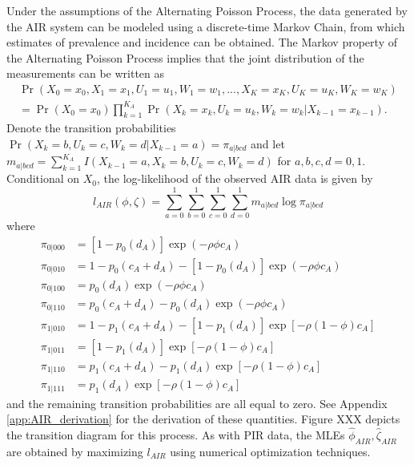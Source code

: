 \documentclass[man, noextraspace, floatsintext]{apa6}\usepackage[]{graphicx}\usepackage[]{color}
\begin{document}
Under the assumptions of the Alternating Poisson Process, the data generated by the AIR system can be modeled using a discrete-time Markov Chain, from which estimates of prevalence and incidence can be obtained. 
The Markov property of the Alternating Poisson Process implies that the joint distribution of the measurements can be written as
\begin{multline}
\Pr\left(X_0=x_0,X_1=x_1,U_1 = u_1, W_1 = w_1,..., X_K=x_K, U_K = u_K, W_K = w_K \right) \\ = \Pr\left(X_0 = x_0\right) \prod_{k=1}^{K_A} \Pr\left(X_k = x_k, U_k = u_k, W_k = w_k | X_{k-1} = x_{k-1}\right). 
\end{multline}
Denote the transition probabilities $\Pr\left(X_k = b, U_k = c, W_k = d | X_{k-1} = a\right) = \pi_{a|bcd}$ and let $m_{a|bcd} = \sum_{k=1}^{K_A} I\left(X_{k-1} = a, X_k = b, U_k = c, W_k = d \right)$ for $a,b,c,d = 0,1$. 
Conditional on $X_0$, the log-likelihood of the observed AIR data is given by
\begin{equation}
\label{eq:AIR_loglik}
l_{AIR}\left(\phi,\zeta\right) = \sum_{a=0}^1 \sum_{b=0}^1 \sum_{c=0}^1 \sum_{d=0}^1 m_{a|bcd} \log \pi_{a|bcd}
\end{equation}
where
\begin{align*}
\pi_{0|000} &= \left[1 - p_0(d_A)\right]\exp\left(-\rho\phi c_A\right) \\
\pi_{0|010} &= 1 - p_0(c_A + d_A) - \left[1 - p_0(d_A)\right]\exp\left(-\rho\phi c_A\right) \\
\pi_{0|100} &= p_0(d_A)\exp\left(-\rho\phi c_A\right) \\
\pi_{0|110} &= p_0(c_A + d_A) - p_0(d_A) \exp\left(-\rho\phi c_A\right) \\
\pi_{1|010} &= 1 - p_1(c_A + d_A) - \left[1 - p_1(d_A)\right]\exp\left[-\rho(1 - \phi) c_A\right] \\
\pi_{1|011} &= \left[1 - p_1(d_A)\right]\exp\left[-\rho(1 - \phi) c_A\right] \\
\pi_{1|110} &= p_1(c_A + d_A) - p_1(d_A) \exp\left[-\rho(1 - \phi) c_A\right] \\
\pi_{1|111} &= p_1(d_A)\exp\left[-\rho(1 - \phi) c_A\right]
\end{align*}
and the remaining transition probabilities are all equal to zero. 
See Appendix \ref{app:AIR_derivation} for the derivation of these quantities. 
Figure XXX depicts the transition diagram for this process.
As with PIR data, the MLEs $\hat\phi_{AIR}, \hat\zeta_{AIR}$ are obtained by maximizing $l_{AIR}$ using numerical optimization techniques. 
\end{document}
